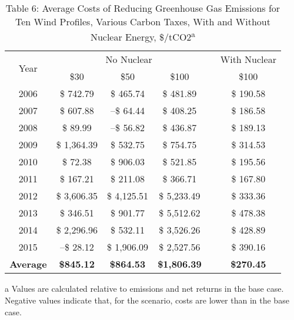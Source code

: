 \begin{table}[]
\centering
\caption{Table 6: Average Costs of Reducing Greenhouse Gas Emissions for Ten Wind Profiles, Various Carbon Taxes, With and Without Nuclear Energy, \$/tCO2\textsuperscript{a}}
\label{my-label6}
\begin{threeparttable}
\begin{tabular}{@{}cccccc@{}}
\toprule
\multirow{2}{*}{Year} & \multicolumn{3}{c}{No Nuclear}                              &           & With Nuclear      \\ \cmidrule(l){2-6} 
                      & \$30              & \$50              & \$100               &           & \$100             \\ \midrule
2006                  & \$ 742.79         & \$ 465.74         & \$ 481.89           &           & \$ 190.58         \\
2007                  & \$ 607.88         & –\$ 64.44         & \$ 408.25           &           & \$ 186.58         \\
2008                  & \$ 89.99          & –\$ 56.82         & \$ 436.87           &           & \$ 189.13         \\
2009                  & \$ 1,364.39       & \$ 532.75         & \$ 754.75           &           & \$ 314.53         \\
2010                  & \$ 72.38          & \$ 906.03         & \$ 521.85           &           & \$ 195.56         \\
2011                  & \$ 167.21         & \$ 211.08         & \$ 366.71           &           & \$ 167.80         \\
2012                  & \$ 3,606.35       & \$ 4,125.51       & \$ 5,233.49         &           & \$ 333.36         \\
2013                  & \$ 346.51         & \$ 901.77         & \$ 5,512.62         &           & \$ 478.38         \\
2014                  & \$ 2,296.96       & \$ 532.11         & \$ 3,526.26         &           & \$ 428.89         \\
2015                  & –\$ 28.12         & \$ 1,906.09       & \$ 2,527.56         &           & \$ 390.16         \\
\textbf{Average}      & \textbf{\$845.12} & \textbf{\$864.53} & \textbf{\$1,806.39} & \textbf{} & \textbf{\$270.45} \\ \bottomrule
\end{tabular}

    \begin{tablenotes}
      \small
      \item a Values are calculated relative to emissions and net returns in the base case. Negative values indicate that, for the scenario, costs are lower than in the base case.
    \end{tablenotes}

\end{threeparttable}

\end{table}



